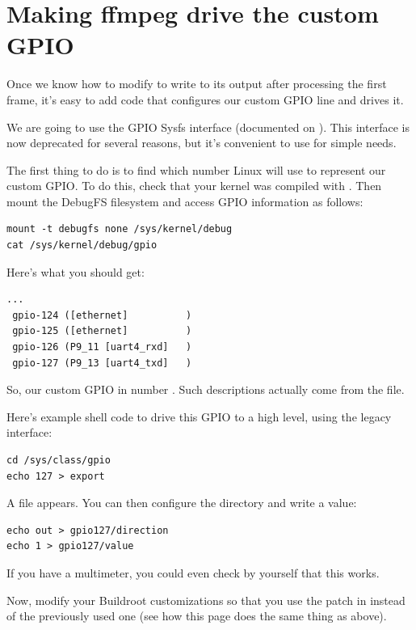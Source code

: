 \section{Making ffmpeg drive the custom GPIO}

Once we know how to modify  to write to its output after
processing the first frame, it's easy to add code that configures our
custom GPIO line and drives it.

We are going to use the GPIO Sysfs interface (documented on
). This interface is now
deprecated for several reasons, but it's convenient to use for
simple needs.

The first thing to do is to find which number Linux will use to
represent our custom GPIO. To do this, check that your kernel was
compiled with . Then mount the DebugFS filesystem and
access GPIO information as follows:

\begin{verbatim}
mount -t debugfs none /sys/kernel/debug
cat /sys/kernel/debug/gpio
\end{verbatim}

Here's what you should get:

\begin{verbatim}
...
 gpio-124 ([ethernet]          )
 gpio-125 ([ethernet]          )
 gpio-126 (P9_11 [uart4_rxd]   )
 gpio-127 (P9_13 [uart4_txd]   )
\end{verbatim}

So, our custom GPIO in number . Such descriptions actually
come from the  file.

Here's example shell code to drive this GPIO to a high level,
using the legacy interface:

\begin{verbatim}
cd /sys/class/gpio
echo 127 > export
\end{verbatim}

A  file appears. You can then configure the directory and
write a value:

\begin{verbatim}
echo out > gpio127/direction
echo 1 > gpio127/value
\end{verbatim}

If you have a multimeter, you could even check by yourself that this
works.

Now, modify your Buildroot customizations so that you use the patch in
instead of the previously used one (see how this page does the same
thing as above).

